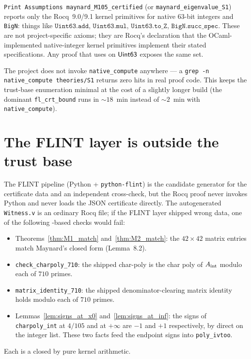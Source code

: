 \texttt{Print Assumptions maynard\_M105\_certified} (or
\texttt{maynard\_eigenvalue\_S1}) reports only the Rocq~9.0/9.1 kernel
primitives for native 63-bit integers and \texttt{BigN}: things like
$\texttt{Uint63.add}$, $\texttt{Uint63.mul}$, $\texttt{Uint63.to\_Z}$,
$\texttt{BigN.succ\_spec}$. These are not project-specific axioms;
they are Rocq's declaration that the OCaml-implemented native-integer
kernel primitives implement their stated specifications. Any proof
that uses \vmcompute{} on $\mathsf{Uint63}$ exposes the same set.

The project does not invoke \texttt{native\_compute} anywhere — a
\texttt{grep -n native\_compute theories/S1} returns zero hits in real
proof code. This keeps the trust-base enumeration minimal at the cost
of a slightly longer build (the dominant \texttt{fl\_crt\_bound}
\vmcompute{} runs in ${\sim}18$~min instead of ${\sim}2$~min with
\texttt{native\_compute}).

\section{The FLINT layer is outside the trust base}

The FLINT pipeline (Python + \texttt{python-flint}) is the candidate
generator for the certificate data and an independent cross-check, but
the Rocq proof never invokes Python and never loads the JSON
certificate directly. The autogenerated \texttt{Witness.v} is an
ordinary Rocq file; if the FLINT layer shipped wrong data, one of the
following \vmcompute{}-based checks would fail:
\begin{itemize}
\item Theorems~\ref{thm:M1_match} and~\ref{thm:M2_match}: the
  $42 \times 42$ matrix entries match Maynard's closed form
  (Lemma~8.2).
\item \texttt{check\_charpoly\_710}: the shipped char-poly is the
  char poly of $A_{\mathrm{int}}$ modulo each of $710$ primes.
\item \texttt{matrix\_identity\_710}: the shipped denominator-clearing
  matrix identity holds modulo each of $710$ primes.
\item Lemmas~\ref{lem:signs_at_x0} and~\ref{lem:signs_at_inf}: the
  signs of \texttt{charpoly\_int} at $4/105$ and at $+\infty$ are
  $-1$ and $+1$ respectively, by direct \vmcompute{} on the integer
  list. These two facts feed the endpoint signs into
  \texttt{poly\_ivtoo}.
\end{itemize}
Each is a \Qed{} closed by pure kernel arithmetic.

